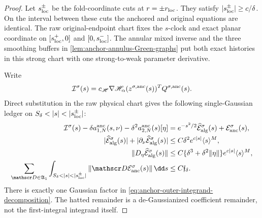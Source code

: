 \begin{proof}
Let \(s_{\rm loc}^\pm\) be the fold-coordinate cuts at
\(r=\pm r_{\rm loc}\).  They satisfy
\(|s_{\rm loc}^\pm|\ge c/\delta\).  On the interval between these cuts the
anchored and original equations are identical.  The raw original-endpoint
chart fixes the \(s\)-clock and exact planar coordinate on
\([s_{\rm loc}^+,0]\) and \([0,s_{\rm loc}^-]\).  The annular mixed
inverse and the three smoothing buffers in
\cref{lem:anchor-annulus-Green-graphs} put both exact histories in this
strong chart with one strong-to-weak parameter derivative.

Write
\[
 \mathcal I^\sigma(s)
 =c_{\mathscr H}\nabla\mathscr H_\alpha(z^{\sigma,\rm anc}(s))^T
       Q^{\sigma,\rm anc}(s).
\]
Direct substitution in the raw physical chart gives the following
single-Gaussian ledger on
\(S_\delta<|s|<|s_{\rm loc}^\pm|\):
\begin{align}
 \mathcal I^\sigma(s)
  -\delta a^{\rm anc}_{1,N}(s,\nu)
  -\delta^2a^{\rm anc}_{2,N}(s)[\eta]
 &=e^{-s^2/2}\widehat{\mathcal E}_{\rm alg}^\sigma(s)
      +\mathcal E_{\rm anc}^\sigma(s),             \label{eq:anchor-outer-integrand-decomposition}\\
 |\widehat{\mathcal E}_{\rm alg}^\sigma(s)|
  +|\partial_\nu\widehat{\mathcal E}_{\rm alg}^\sigma(s)|
 &\le C\delta^2e^{c|s|}\langle s\rangle^M,\notag\\
 \|D_\eta\widehat{\mathcal E}_{\rm alg}^\sigma(s)\|
 &\le C\{\delta^3+\delta^2\|\eta\|\}
          e^{c|s|}\langle s\rangle^M,              \label{eq:anchor-outer-coefficient-ledger}\\
 \sum_{\mathscr D\in\mathfrak A_1}
  \int_{S_\delta<|s|<|s_{\rm loc}^\pm|}
       \|\mathscr D\mathcal E_{\rm anc}^\sigma(s)\|\,\dd s
 &\le C\mathfrak f_\delta .                        \label{eq:anchor-outer-boundary-ledger}
\end{align}
There is exactly one Gaussian factor in
\cref{eq:anchor-outer-integrand-decomposition}.  The hatted remainder is a
de-Gaussianized coefficient remainder, not the first-integral integrand
itself.


\end{proof}
